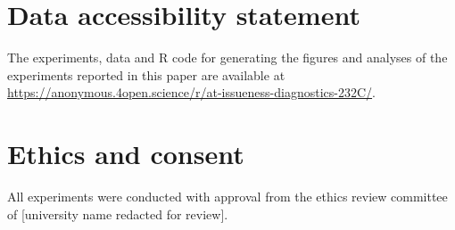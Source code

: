 \documentclass[times,linguex]{glossa}
\begin{document}
\pagebreak

\section*{Data accessibility statement}
The experiments, data and R code for generating the figures and analyses of the experiments reported in this paper are available at \url{https://anonymous.4open.science/r/at-issueness-diagnostics-232C/}.

\section*{Ethics and consent}
All experiments were conducted with approval from the ethics review committee of [university name redacted for review].








\appendix

\setcounter{table}{0}
\renewcommand{\thetable}{A\arabic{table}}

\setcounter{figure}{0}
\renewcommand{\thefigure}{A\arabic{figure}}
\end{document}
